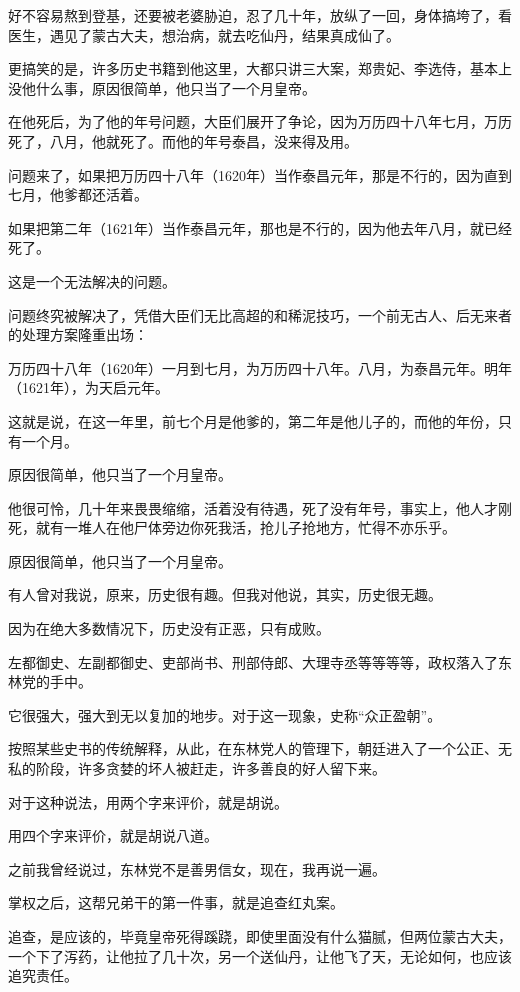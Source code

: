 \begin{multicols}{\theparacolNo}
		好不容易熬到登基，还要被老婆胁迫，忍了几十年，放纵了一回，身体搞垮了，看医生，遇见了蒙古大夫，想治病，就去吃仙丹，结果真成仙了。

		更搞笑的是，许多历史书籍到他这里，大都只讲三大案，郑贵妃、李选侍，基本上没他什么事，原因很简单，他只当了一个月皇帝。

		在他死后，为了他的年号问题，大臣们展开了争论，因为万历四十八年七月，万历死了，八月，他就死了。而他的年号泰昌，没来得及用。

		问题来了，如果把万历四十八年（1620年）当作泰昌元年，那是不行的，因为直到七月，他爹都还活着。

		如果把第二年（1621年）当作泰昌元年，那也是不行的，因为他去年八月，就已经死了。

		这是一个无法解决的问题。

		问题终究被解决了，凭借大臣们无比高超的和稀泥技巧，一个前无古人、后无来者的处理方案隆重出场：

		万历四十八年（1620年）一月到七月，为万历四十八年。八月，为泰昌元年。明年（1621年），为天启元年。

		这就是说，在这一年里，前七个月是他爹的，第二年是他儿子的，而他的年份，只有一个月。

		原因很简单，他只当了一个月皇帝。

		他很可怜，几十年来畏畏缩缩，活着没有待遇，死了没有年号，事实上，他人才刚死，就有一堆人在他尸体旁边你死我活，抢儿子抢地方，忙得不亦乐乎。

		原因很简单，他只当了一个月皇帝。

		有人曾对我说，原来，历史很有趣。但我对他说，其实，历史很无趣。

		因为在绝大多数情况下，历史没有正恶，只有成败。

		左都御史、左副都御史、吏部尚书、刑部侍郎、大理寺丞等等等等，政权落入了东林党的手中。

		它很强大，强大到无以复加的地步。对于这一现象，史称“众正盈朝”。

		按照某些史书的传统解释，从此，在东林党人的管理下，朝廷进入了一个公正、无私的阶段，许多贪婪的坏人被赶走，许多善良的好人留下来。

		对于这种说法，用两个字来评价，就是胡说。

		用四个字来评价，就是胡说八道。

		之前我曾经说过，东林党不是善男信女，现在，我再说一遍。

		掌权之后，这帮兄弟干的第一件事，就是追查红丸案。

		追查，是应该的，毕竟皇帝死得蹊跷，即使里面没有什么猫腻，但两位蒙古大夫，一个下了泻药，让他拉了几十次，另一个送仙丹，让他飞了天，无论如何，也应该追究责任。


\end{multicols}
